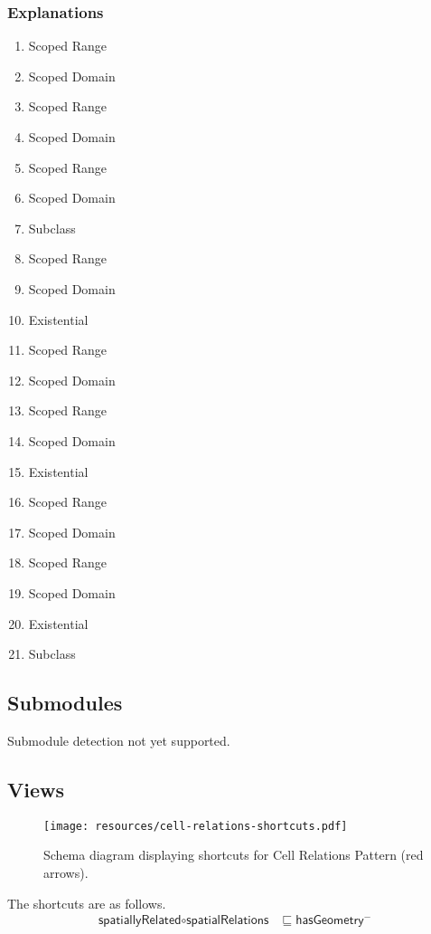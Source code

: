 \subsubsection{Explanations}
\begin{enumerate}
  \item Scoped Range
  \item Scoped Domain
  \item Scoped Range
  \item Scoped Domain
  \item Scoped Range
  \item Scoped Domain
  \item Subclass
  \item Scoped Range
  \item Scoped Domain
  \item Existential
  \item Scoped Range
  \item Scoped Domain
  \item Scoped Range
  \item Scoped Domain
  \item Existential
  \item Scoped Range
  \item Scoped Domain
  \item Scoped Range
  \item Scoped Domain
  \item Existential
  \item Subclass
\end{enumerate}

\subsection{Submodules}
\label{ssec:submodules}
Submodule detection not yet supported.

\subsection{Views}
\label{ssec:views}
\begin{figure}[h!]
  \begin{center}
    \texttt{[image: resources/cell-relations-shortcuts.pdf]}
  \end{center}
  \caption{Schema diagram displaying shortcuts for Cell Relations Pattern (red arrows).}
  \label{fig:sc-diagram}
\end{figure}
The shortcuts are as follows.\begin{align}
\textsf{spatiallyRelated}  \circ \textsf{spatialRelations} &\sqsubseteq \textsf{hasGeometry$^-$} \end{align}


